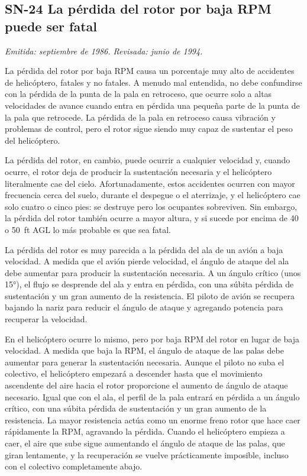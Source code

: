 \subsection*{SN-24 \quad La pérdida del rotor por baja RPM puede ser fatal}
{\small\textit{Emitida: septiembre de 1986. Revisada: junio de 1994.}}

La pérdida del rotor por baja RPM causa un porcentaje muy alto de accidentes de helicóptero, fatales y no fatales. A menudo mal entendida, no debe confundirse con la pérdida de la punta de la pala en retroceso, que ocurre solo a altas velocidades de avance cuando entra en pérdida una pequeña parte de la punta de la pala que retrocede. La pérdida de la pala en retroceso causa vibración y problemas de control, pero el rotor sigue siendo muy capaz de sustentar el peso del helicóptero.

La pérdida del rotor, en cambio, puede ocurrir a cualquier velocidad y, cuando ocurre, el rotor deja de producir la sustentación necesaria y el helicóptero literalmente cae del cielo. Afortunadamente, estos accidentes ocurren con mayor frecuencia cerca del suelo, durante el despegue o el aterrizaje, y el helicóptero cae solo cuatro o cinco pies: se destruye pero los ocupantes sobreviven. Sin embargo, la pérdida del rotor también ocurre a mayor altura, y si sucede por encima de 40 o 50~ft AGL lo más probable es que sea fatal.

La pérdida del rotor es muy parecida a la pérdida del ala de un avión a baja velocidad. A medida que el avión pierde velocidad, el ángulo de ataque del ala debe aumentar para producir la sustentación necesaria. A un ángulo crítico (unos 15°), el flujo se desprende del ala y entra en pérdida, con una súbita pérdida de sustentación y un gran aumento de la resistencia. El piloto de avión se recupera bajando la nariz para reducir el ángulo de ataque y agregando potencia para recuperar la velocidad.

En el helicóptero ocurre lo mismo, pero por baja RPM del rotor en lugar de baja velocidad. A medida que baja la RPM, el ángulo de ataque de las palas debe aumentar para generar la sustentación necesaria. Aunque el piloto no suba el colectivo, el helicóptero empezará a descender hasta que el movimiento ascendente del aire hacia el rotor proporcione el aumento de ángulo de ataque necesario. Igual que con el ala, el perfil de la pala entrará en pérdida a un ángulo crítico, con una súbita pérdida de sustentación y un gran aumento de la resistencia. La mayor resistencia actúa como un enorme freno rotor que hace caer rápidamente la RPM, agravando la pérdida. Cuando el helicóptero empieza a caer, el aire que sube sigue aumentando el ángulo de ataque de las palas, que giran lentamente, y la recuperación se vuelve prácticamente imposible, incluso con el colectivo completamente abajo.

